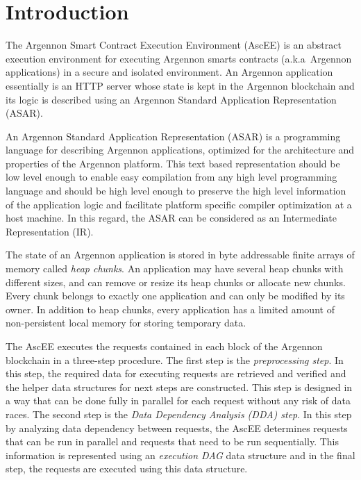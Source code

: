 

\section{Introduction}\label{sec:introduction}

The Argennon Smart Contract Execution Environment (AscEE) is an abstract execution environment for executing Argennon
smarts contracts (a.k.a\ Argennon applications) in a secure and isolated environment. An Argennon application
essentially is an HTTP server whose state is
kept in the Argennon blockchain and its logic is described using an Argennon Standard Application Representation (ASAR).

An Argennon Standard Application Representation (ASAR) is a programming language for describing Argennon
applications, optimized
for the architecture and properties of the Argennon platform. This text based representation should be low level
enough to enable easy compilation from any high level programming language and should be high level enough to preserve
the high level information of the application logic and facilitate platform specific compiler optimization at a host
machine. In this regard, the ASAR can be considered as an Intermediate Representation (IR).

The state of an Argennon application is stored in byte addressable finite arrays of memory called
\emph{heap chunks}. An application may have several heap chunks with different sizes, and can remove or
resize its heap chunks or allocate new chunks. Every chunk belongs to exactly one application and can only be modified
by its owner. In addition to heap chunks, every application has a limited amount of non-persistent local memory for
storing temporary data.

The AscEE executes the requests contained in each block of the Argennon
blockchain in a three-step procedure. The first step is the \emph{preprocessing step}. In this step, the required
data for executing requests are retrieved and verified and the
helper data structures for next steps are constructed. This step is
designed in a way that can be done fully in parallel for each request without any risk of data races. The second
step is the \emph{Data Dependency Analysis (DDA) step}.
In this step by analyzing data dependency between requests, the AscEE determines requests that can be run in parallel
and requests that need to be run sequentially. This information is represented using an \emph{execution DAG} data
structure and in the final step, the requests are executed using this data structure.


